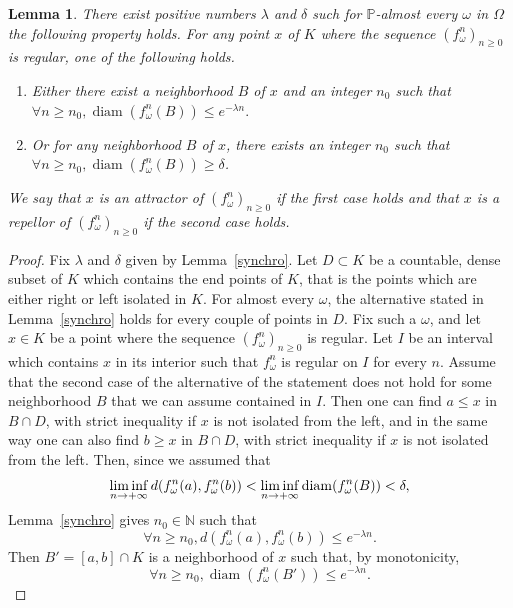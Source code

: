 \documentclass[10pt]{amsart}
\newtheorem{lemm}[theo]{Lemma}\newtheorem{prop}[theo]{Proposition}\newtheorem{coro}[theo]{Corollary}\newtheorem{conj}[theo]{Conjecture}
\theoremstyle{definition}\newtheorem{defi}[theo]{Definition}\newtheorem{rema}[theo]{Remark}\newtheorem{exam}[theo]{Example}\newtheorem{exem}[theo]{Example}\newtheorem{nota}[theo]{Notation}
\DeclareMathOperator{\diam}{diam}
\newcommand{\bbP}{\mathbb{P}}
\newcommand{\N}{\mathbb{N}}
\newcounter{setofcase}
\newcounter{case}[setofcase]
\renewcommand*{\to}{\mathchoice{\longrightarrow}{\rightarrow}{\rightarrow}{\rightarrow}}
\let\originalleft\left
\let\originalright\right
\renewcommand{\left}{\mathopen{}\mathclose\bgroup\originalleft}
\renewcommand{\right}{\aftergroup\egroup\originalright}
\let\oldforall\forall
\renewcommand*{\forall}{\mathrel{\oldforall}}
\begin{document}
\begin{lemm}
There exist positive numbers $\lambda$ and $\delta$ such for $\bbP$-almost every $\omega$ in $\Omega$ the following property holds. For any point $x$ of $K$ where the sequence $(f_\omega^n)_{n\geq 0}$ is regular, one of the following holds.
\begin{enumerate}
\item\label{lemm5.5.1} Either there exist a neighborhood $B$ of $x$ and an integer $n_0$ such that $\forall n \geq n_0, \diam(f_\omega^n(B)) \leq e^{-\lambda n}.$
\item\label{lemm5.5.2} Or for any neighborhood $B$ of $x$, there exists an integer $n_0$ such that $\forall n\geq n_0, \diam(f_\omega^n(B))\geq \delta$.
\end{enumerate}
We say that $x$ is an attractor of $(f_\omega^n)_{n\geq 0}$ if the first case holds and that $x$ is a repellor of $(f_\omega^n)_{n\geq 0}$ if the second case holds.
\end{lemm}

\begin{proof}
Fix $\lambda$ and $\delta$ given by Lemma~\ref{synchro}. Let $D\subset K$ be a countable, dense subset of $K$ which contains the end points of $K$, that is the points which are either right or left isolated in $K$. For almost every $\omega$, the alternative stated in Lemma~\ref{synchro} holds for every couple of points in $D$. Fix such a $\omega$, and let $x\in K$ be a point where the sequence $(f^n_\omega)_{n \geq 0}$ is regular. Let $I$ be an interval which contains $x$ in its interior such that $f_\omega^n$ is regular on $I$ for every $n$. Assume that the second case of the alternative of the statement does not hold for some neighborhood $B$ that we can assume contained in $I$. Then one can find $a\leq x$ in $B\cap D$, with strict inequality if $x$ is not isolated from the left, and in the same way one can also find $b\geq x$ in $B\cap D$, with strict inequality if $x$ is not isolated from the left. Then, since we assumed that
\[
\liminf_{n\to +\infty} d\left(f_\omega^n(a),f_\omega^n(b)\right) <\liminf_{n\to +\infty} \diam(f_\omega^n(B))<\delta,
\]
Lemma~\ref{synchro} gives $n_0\in\N$ such that
\[
\forall n\geq n_0, d(f_\omega^n(a),f_\omega^n(b))\leq e^{-\lambda n}.
\]
Then $B'=[a,b]\cap K$ is a neighborhood of $x$ such that, by monotonicity,
\[
\forall n\geq n_0, \diam(f_\omega^n(B'))\leq e^{-\lambda n}.
\]
\end{proof}
\end{document}

